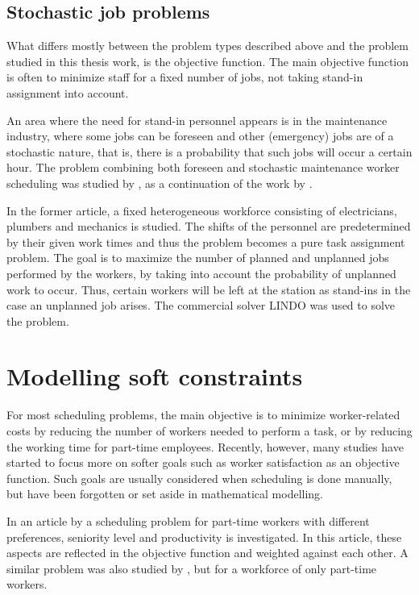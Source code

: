 \subsection{Stochastic job problems} \label{STOCH}
What differs mostly between the problem types described above and the problem studied in this thesis work, is the objective function. The main objective function is often to minimize staff for a fixed number of jobs, not taking stand-in assignment into account.

An area where the need for stand-in personnel appears is in the  maintenance industry, where some jobs can be foreseen and other (emergency) jobs are of a stochastic nature, that is, there is a probability that such jobs will occur a certain hour. The problem combining both foreseen and stochastic maintenance worker scheduling was studied by \citet{duffuaa_1999}, as a continuation of the work by \citet{roberts_1983}. 

In the former article, a fixed heterogeneous workforce consisting of electricians, plumbers and mechanics is studied. The shifts of the personnel are predetermined by their given work times and thus the problem becomes a pure task assignment problem. The goal is to maximize the number of planned and unplanned jobs performed by the workers, by taking into account the probability of unplanned work to occur. Thus, certain workers will be left at the station as stand-ins in the case an unplanned job arises. The commercial solver LINDO was used to solve the problem.


\section{Modelling soft constraints} \label{MSC}
For most scheduling problems, the main objective is to minimize worker-related costs by reducing the number of workers needed to perform a task, or by reducing the working time for part-time employees. Recently, however, many studies have started to focus more on softer goals such as worker satisfaction as an objective function. Such goals are usually considered when scheduling is done manually, but have been forgotten or set aside in mathematical modelling.

 In an article by \citet{akbari_2013} a scheduling problem for part-time workers with different preferences, seniority level and productivity is investigated. In this article, these aspects are reflected in the objective function and weighted against each other. A similar problem was also studied by \citet{mohan_2008}, but for a workforce of only part-time workers. %

